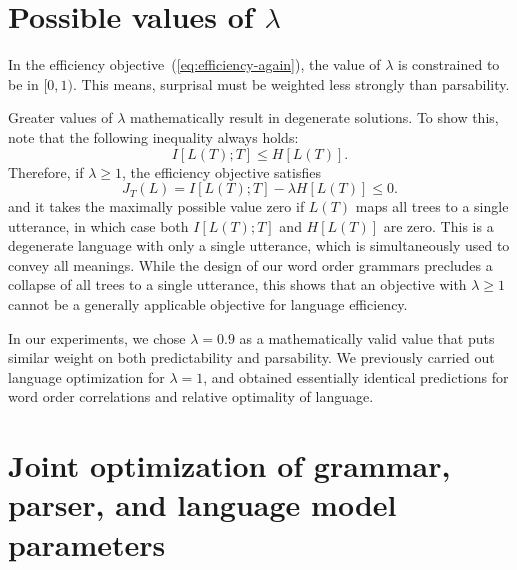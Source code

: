 \documentclass[12pt]{article}
\begin{document}
\section{Possible values of $\lambda$}

In the efficiency objective~(\ref{eq:efficiency-again}), the value of $\lambda$ is constrained to be in $[0,1)$.
This means, surprisal must be weighted less strongly than parsability.

Greater values of $\lambda$ mathematically result in degenerate solutions.
To show this, note that the following inequality always holds:
\begin{equation}
I[L(T); T] \leq H[L(T)].
\end{equation}
Therefore, if $\lambda \geq 1$, the efficiency objective satisfies 
\begin{equation}
    J_T(L) = I[L(T); T] - \lambda H[L(T)] \leq 0.
\end{equation}
and it takes the maximally possible value zero if $L(T)$ maps all trees to a single utterance, in which case both $I[L(T); T]$ and $H[L(T)]$ are zero.
This is a degenerate language with only a single utterance, which is simultaneously used to convey all meanings.
While the design of our word order grammars precludes a collapse of all trees to a single utterance, this shows that an objective with $\lambda \geq 1$ cannot be a generally applicable objective for language efficiency.

In our experiments, we chose $\lambda = 0.9$ as a mathematically valid value that puts similar weight on both predictability and parsability.
We previously carried out language optimization for $\lambda = 1$, and obtained essentially identical predictions for word order     correlations and relative optimality of language.


\section{Joint optimization of grammar, parser, and language model parameters}
\end{document}
